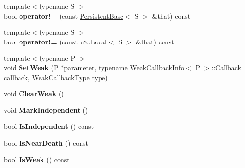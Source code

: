 \begin{DoxyCompactItemize}
{\footnotesize template$<$typename S $>$ }\\bool {\bfseries operator!=} (const \hyperlink{class_nan_1_1_persistent_base}{Persistent\+Base}$<$ S $>$ \&that) const
\item 
\mbox{\label{class_nan_1_1_persistent_base_ad9f6674eb573fcce517906fb8f418219}} 
{\footnotesize template$<$typename S $>$ }\\bool {\bfseries operator!=} (const v8\+::\+Local$<$ S $>$ \&that) const
\item 
\mbox{\label{class_nan_1_1_persistent_base_abca5a8d5f69f235307238d56b934eee3}} 
{\footnotesize template$<$typename P $>$ }\\void {\bfseries Set\+Weak} (P $\ast$parameter, typename \hyperlink{class_nan_1_1_weak_callback_info}{Weak\+Callback\+Info}$<$ P $>$\+::\hyperlink{class_nan_1_1_callback}{Callback} callback, \hyperlink{struct_nan_1_1_weak_callback_type}{Weak\+Callback\+Type} type)
\item 
\mbox{\label{class_nan_1_1_persistent_base_aadffcae03668b0ecea9c0485e7c03ea1}} 
void {\bfseries Clear\+Weak} ()
\item 
\mbox{\label{class_nan_1_1_persistent_base_a5c9dd8fc7cf345c0d8812fbab304c385}} 
void {\bfseries Mark\+Independent} ()
\item 
\mbox{\label{class_nan_1_1_persistent_base_ad92840ffac447e087e1d2768d538cfcd}} 
bool {\bfseries Is\+Independent} () const
\item 
\mbox{\label{class_nan_1_1_persistent_base_a1a79e4f71ab74ab8c9cb2087b5fea8f3}} 
bool {\bfseries Is\+Near\+Death} () const
\item 
\mbox{\label{class_nan_1_1_persistent_base_a1698518cdee79f0e5541599bf1744144}} 
bool {\bfseries Is\+Weak} () const
\end{DoxyCompactItemize}
